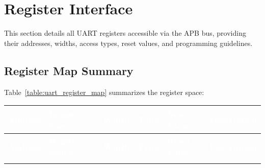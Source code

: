 \section{Register Interface}

This section details all UART registers accessible via the APB bus, providing their addresses, widths, access types, reset values, and programming guidelines.

\subsection{Register Map Summary}
Table~\ref{table:uart_register_map} summarizes the register space:

\renewcommand*{\arraystretch}{1.25}
\begingroup
\small
{}
\begin{longtable}{|p{}|p{}|p{}|p{}|p{}|p{}|}
\hline
\rowcolor{gray}
\textcolor{white}{\textbf{Address}} &
\textcolor{white}{\textbf{Register Name}} &
\textcolor{white}{\textbf{Width}} &
\textcolor{white}{\textbf{Type}} &
\textcolor{white}{\textbf{Reset Value}} &
\textcolor{white}{\textbf{Description}} \\ 
\hline
\endfirsthead

\hline
\rowcolor{gray}
\textcolor{white}{\textbf{Address}} &
\textcolor{white}{\textbf{Register Name}} &
\textcolor{white}{\textbf{Width}} &
\textcolor{white}{\textbf{Type}} &
\textcolor{white}{\textbf{Reset Value}} &
\textcolor{white}{\textbf{Description}} \\
\hline
\endhead

\hline
\endfoot


\end{longtable}
